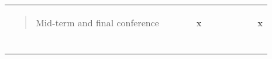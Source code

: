 \begin{longtable}[]{@{}lllllllllll@{}}
\begin{minipage}[t]{0.07\columnwidth}
\begin{quote}
Mid-term and final conference \end{quote}\strut \end{minipage} & \begin{minipage}[t]{0.07\columnwidth}\raggedright \strut \end{minipage} & \begin{minipage}[t]{0.07\columnwidth}\raggedright \strut \end{minipage} & \begin{minipage}[t]{0.07\columnwidth}\raggedright \strut \end{minipage} & \begin{minipage}[t]{0.07\columnwidth}\raggedright x\strut \end{minipage} & \begin{minipage}[t]{0.07\columnwidth}\raggedright \strut \end{minipage} & \begin{minipage}[t]{0.07\columnwidth}\raggedright \strut \end{minipage} & \begin{minipage}[t]{0.07\columnwidth}\raggedright \strut \end{minipage} & \begin{minipage}[t]{0.07\columnwidth}\raggedright \strut \end{minipage} & \begin{minipage}[t]{0.07\columnwidth}\raggedright \strut \end{minipage} & \begin{minipage}[t]{0.07\columnwidth}\raggedright x\strut \end{minipage}\tabularnewline \begin{minipage}[t]{0.07\columnwidth}\raggedright \begin{quote}

\end{quote}
\end{minipage}
\end{longtable}
